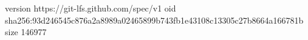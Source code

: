 version https://git-lfs.github.com/spec/v1
oid sha256:93d246545c876a2a8989a02465899b743fb1e43108c13305c27b8664a166781b
size 146977
